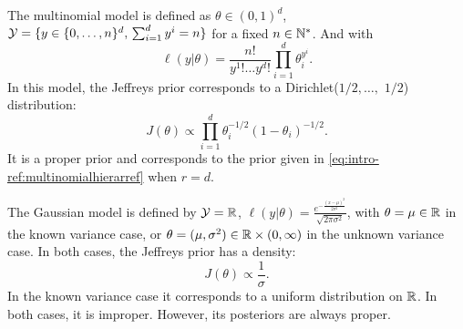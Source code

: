 \color{orange}

\begin{ex}
    The multinomial model is defined as $\theta\in(0,1)^d$, $\mathcal{Y}=\{y\in\{0,\dots,n\}^d,\,\sum_{i=1}^dy^i=n\} $ for a fixed $n\in\mathbb{N}^\ast$.
    And with 
        \begin{equation}
            \ell(y|\theta) = \frac{n!}{y^1!\dots y^d!}\prod_{i=1}^d\theta_i^{y^i}.
        \end{equation}
    In this model, the Jeffreys prior corresponds to a Dirichlet($1/2,\dots,$ $1/2$) distribution:
        \begin{equation}
            J(\theta)\propto \prod_{i=1}^d\theta_i^{-1/2}(1-\theta_i)^{-1/2}.
        \end{equation}
    It is a proper prior and corresponds to the prior given in \cref{eq:intro-ref:multinomialhierarref} when $r=d$.  
\end{ex}

\begin{ex}
    The Gaussian model is defined by $\mathcal{Y}=\mathbb{R}$, $\ell(y|\theta) = \frac{e^{-\frac{(x-\mu)^2}{2\sigma^2}}}{\sqrt{2\pi\sigma^2}} $, with $\theta=\mu\in\mathbb{R} $ in the known variance case, or $\theta=(\mu,\sigma^2)\in\mathbb{R}\times(0,\infty) $ in the unknown variance case.
    In both cases, the Jeffreys prior has a density:
        \begin{equation}
            J(\theta)\propto \frac{1}{\sigma}.
        \end{equation}    
    In the known variance case it corresponds to a uniform distribution on $\mathbb{R}$. In both cases, it is improper.  However, its posteriors are always proper.
\end{ex}

\color{black}


